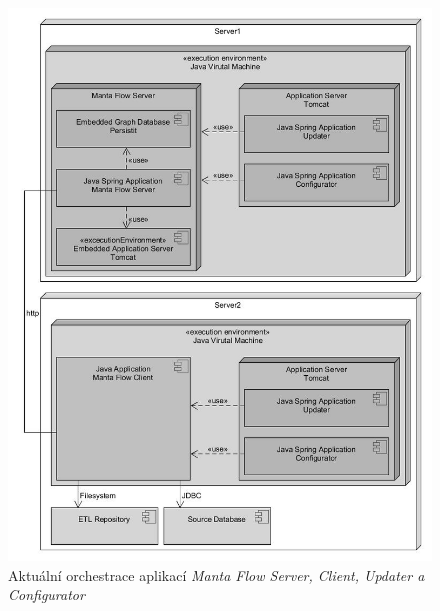\documentclass[11pt,twoside,a4paper]{book}
\begin{document}
\begin{figure}
\begin{center}
\includegraphics[width=14cm]{figures/deployment_1}
\caption{Aktuální orchestrace aplikací \textit{Manta Flow Server, Client, Updater a Configurator}}
\label{fig:ana-deployment}
\end{center}
\end{figure}
\end{document}
